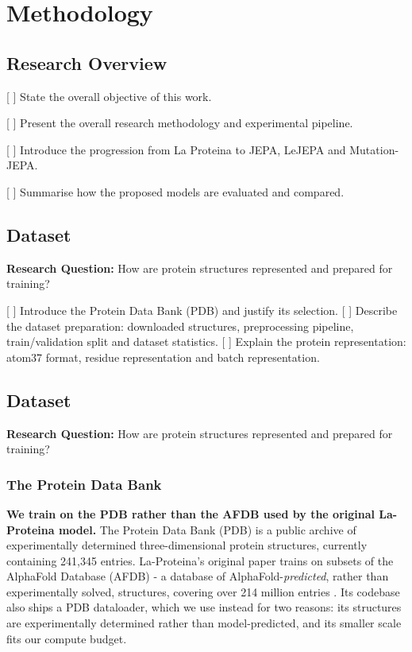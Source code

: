 \section{Methodology}
\label{sec:methodology}

\subsection{Research Overview}
[ ] State the overall objective of this work.

[ ] Present the overall research methodology and experimental pipeline.

[ ] Introduce the progression from La Proteina to JEPA, LeJEPA and Mutation-JEPA.

[ ] Summarise how the proposed models are evaluated and compared.

\subsection{Dataset}
\textbf{Research Question:} How are protein structures represented and prepared for training?

[ ] Introduce the Protein Data Bank (PDB) and justify its selection.
[ ] Describe the dataset preparation: downloaded structures, preprocessing pipeline, train/validation split and dataset statistics.
[ ] Explain the protein representation: atom37 format, residue representation and batch representation.

\subsection{Dataset}
\textbf{Research Question:} How are protein structures represented and prepared for training?

\subsubsection{The Protein Data Bank}

\textbf{We train on the PDB rather than the AFDB used by the original La-Proteina model.}
The Protein Data Bank (PDB) \citep{berman2000pdb} is a public archive of experimentally
determined three-dimensional protein structures, currently containing 241{,}345 entries.
La-Proteina's original paper trains on subsets of the AlphaFold Database (AFDB)
\citep{la-proteina} - a database of AlphaFold-\emph{predicted}, rather than experimentally solved,
structures, covering over 214 million entries \citep{afdb2024}. Its codebase
also ships a PDB dataloader, which we use instead for two reasons: its
structures are experimentally determined rather than model-predicted, and its smaller scale
fits our compute budget.

